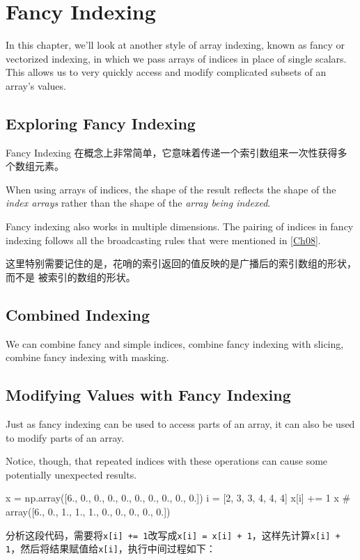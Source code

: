 \chapter{Fancy Indexing}
In this chapter, we'll look at another style of array indexing, known as fancy or
vectorized indexing, in which we pass arrays of indices in place of single scalars. This
allows us to very quickly access and modify complicated subsets of an array's values.

\section{Exploring Fancy Indexing}
Fancy Indexing 在概念上非常简单，它意味着传递一个索引数组来一次性获得多个数组元素。

When using arrays of indices, the shape of the result reflects the shape of the \emph{index arrays} rather than the shape of the \emph{array being indexed}.

Fancy indexing also works in multiple dimensions. The pairing of indices in fancy indexing follows all the broadcasting
rules that were mentioned in \autoref{Ch08}.

这里特别需要记住的是，花哨的索引返回的值反映的是广播后的索引数组的形状，而不是
被索引的数组的形状。
\section{Combined Indexing}
We can combine fancy and simple indices, combine fancy indexing with slicing, combine fancy indexing with masking.

\section{Modifying Values with Fancy Indexing}
Just as fancy indexing can be used to access parts of an array, it can also be used to
modify parts of an array.

Notice, though, that repeated indices with these operations can cause some potentially unexpected results.

\begin{pyc}
    x = np.array([6., 0., 0., 0., 0., 0., 0., 0., 0., 0.])
    i = [2, 3, 3, 4, 4, 4]
    x[i] += 1
    x # array([6., 0., 1., 1., 1., 0., 0., 0., 0., 0.])
\end{pyc}
分析这段代码，需要将\verb|x[i] += 1|改写成\verb|x[i] = x[i] + 1|，这样先计算\verb|x[i] + 1|，然后将结果赋值给\verb|x[i]|，执行中间过程如下：

